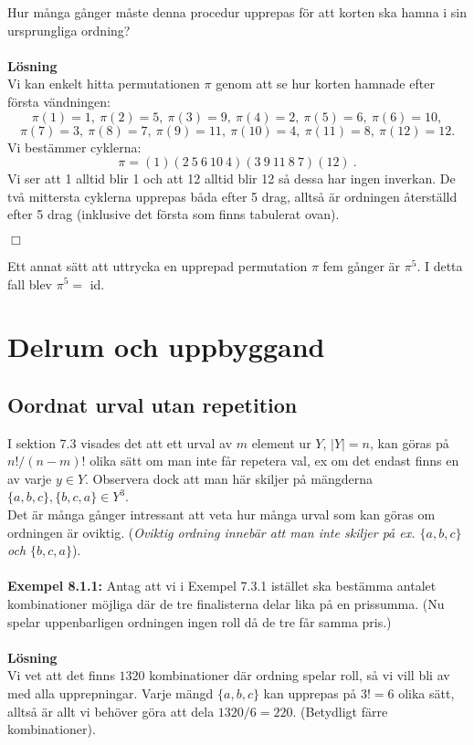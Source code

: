 \documentclass{article}
\begin{document}
Hur många gånger måste denna procedur upprepas för att korten ska hamna i sin ursprungliga ordning?\\ \\ 
\textbf{Lösning}\\ 
Vi kan enkelt hitta permutationen $\pi$ genom att se hur korten hamnade efter första vändningen:
$$
\pi(1)=1, \ \pi(2)=5, \ \pi(3)=9, \ \pi(4)=2, \ \pi(5)=6, \ \pi(6)=10,
$$
$$
\pi(7)=3, \ \pi(8)=7, \ \pi(9)=11, \ \pi(10)=4, \ \pi(11)=8, \ \pi(12)=12.
$$
Vi bestämmer cyklerna:
$$
\pi=(1)(2 \ 5 \ 6 \ 10 \ 4)(3 \ 9 \ 11 \ 8 \ 7)(12) \ .
$$
Vi ser att 1 alltid blir 1 och att 12 alltid blir 12 så dessa har ingen inverkan. De två mittersta cyklerna upprepas båda efter 5 drag, alltså är ordningen återställd efter 5 drag (inklusive det första som finns tabulerat ovan).
\begin{flushright}
$\Box$
\end{flushright}
Ett annat sätt att uttrycka en upprepad permutation $\pi$ fem gånger är $\pi^5$. I detta fall blev $\pi^5=$ id.

\section{Delrum och uppbyggand}
\subsection{Oordnat urval utan repetition}
I sektion 7.3 visades det att ett urval av $m$ element ur $Y$, $|Y|=n$, kan göras på $n!/(n-m)!$ olika sätt om man inte får repetera val, ex om det endast finns en av varje $y\in Y$. Observera dock att man här skiljer på mängderna $\{a,b,c\},\{b,c,a\}\in Y^3$.  \\

Det är många gånger intressant att veta hur många urval som kan göras om ordningen är oviktig. (\textit{Oviktig ordning innebär att man inte skiljer på ex. $\{a,b,c\}$ och $\{b,c,a\}$}).\\ \\
\textbf{Exempel 8.1.1:} Antag att vi i Exempel 7.3.1 istället ska bestämma antalet kombinationer möjliga där de tre finalisterna delar lika på en prissumma. (Nu spelar uppenbarligen ordningen ingen roll då de tre får samma pris.)\\ \\
\textbf{Lösning}\\
Vi vet att det finns $1320$ kombinationer där ordning spelar roll, så vi vill bli av med alla upprepningar. Varje mängd $\{a,b,c\}$ kan upprepas på $3!=6$ olika sätt, alltså är allt vi behöver göra att dela $1320/6=220$. (Betydligt färre kombinationer).\\
\end{document}
